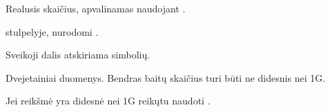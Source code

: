 \documentclass[letterpaper,10pt,lithuanian]{sphinxmanual}
\begin{document}

\begin{fulllineitems}
\label{\detokenize{tipai:type.number}}
\pysigstartsignatures
\pysigline
{}
\pysigstopsignatures
\sphinxAtStartPar
Realusis skaičius, apvalinamas naudojant .

\sphinxAtStartPar
{\hyperref[\detokenize{dimensijos:property.ref}]{}} stulpelyje, nurodomi {\hyperref[\detokenize{vienetai:matavimo-vienetai}]{}}.

\sphinxAtStartPar
Sveikoji dalis atskiriama  simbolių.

\end{fulllineitems}


\begin{fulllineitems}
\label{\detokenize{tipai:type.binary}}
\pysigstartsignatures
\pysigline
{}
\pysigstopsignatures
\sphinxAtStartPar
Dvejetainiai duomenys. Bendras baitų skaičius turi būti ne didesnis nei 1G.

\sphinxAtStartPar
Jei reikšmė yra didesnė nei 1G reikųtu naudoti {\hyperref[\detokenize{tipai:type.file}]{}}.

\end{fulllineitems}

\end{document}
